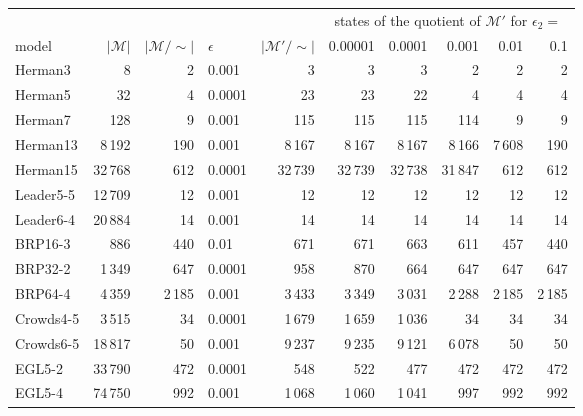 \documentclass[a4paper]{article}
\begin{document}
\begin{center}
\begin{tabular}{lrr@{\quad}lr@{\quad}rrrrr}
\toprule
 & & & & & \multicolumn{5}{c}{states of the quotient of $\mathcal{M}'$ for $\epsilon_2 = {}$} \\
model & $|\mathcal{M}|$ & $|\mathcal{M}/{\sim}|$ & $\epsilon$ & $|\mathcal{M}'/{\sim}|$ & 0.00001 & 0.0001 & 0.001 & 0.01 & 0.1 \\
\midrule
Herman3 & 8 & 2 & 0.001 & 3 & 3 & 3 & \cellcolor{recovered}2 & \cellcolor{recovered}2 & \cellcolor{recovered}2 \\
Herman5 & 32 & 4 & 0.0001 & 23 & 23 & 22 & \cellcolor{recovered}4 & \cellcolor{recovered}4 & \cellcolor{recovered}4 \\
Herman7 & 128 & 9 & 0.001 & 115 & 115 & 115 & 114 & \cellcolor{recovered}9 & \cellcolor{recovered}9 \\
Herman13 & 8\,192 & 190 & 0.001 & 8\,167 & 8\,167 & 8\,167 & 8\,166 & 7\,608 & \cellcolor{recovered}190 \\
Herman15 & 32\,768 & 612 & 0.0001 & 32\,739 & 32\,739 & 32\,738 & 31\,847 & \cellcolor{recovered}612 & \cellcolor{recovered}612 \\
Leader5-5 & 12\,709 & 12 & 0.001 & \cellcolor{recovered}12 & \cellcolor{recovered}12 & \cellcolor{recovered}12 & \cellcolor{recovered}12 & \cellcolor{recovered}12 & \cellcolor{recovered}12 \\
Leader6-4 & 20\,884 & 14 & 0.001 & \cellcolor{recovered}14 & \cellcolor{recovered}14 & \cellcolor{recovered}14 & \cellcolor{recovered}14 & \cellcolor{recovered}14 & \cellcolor{recovered}14 \\
BRP16-3 & 886 & 440 & 0.01 & 671 & 671 & 663 & 611 & 457 & \cellcolor{recovered}440 \\
BRP32-2 & 1\,349 & 647 & 0.0001 & 958 & 870 & 664 & \cellcolor{recovered}647 & \cellcolor{recovered}647 & \cellcolor{recovered}647 \\
BRP64-4 & 4\,359 & 2\,185 & 0.001 & 3\,433 & 3\,349 & 3\,031 & 2\,288 & \cellcolor{recovered}2\,185 & \cellcolor{recovered}2\,185 \\
Crowds4-5 & 3\,515 & 34 & 0.0001 & 1\,679 & 1\,659 & 1\,036 & \cellcolor{recovered}34 & \cellcolor{recovered}34 & \cellcolor{recovered}34 \\
Crowds6-5 & 18\,817 & 50 & 0.001 & 9\,237 & 9\,235 & 9\,121 & 6\,078 & \cellcolor{recovered}50 & \cellcolor{recovered}50 \\
EGL5-2 & 33\,790 & 472 & 0.0001 & 548 & 522 & 477 & \cellcolor{recovered}472 & \cellcolor{recovered}472 & \cellcolor{recovered}472 \\
EGL5-4 & 74\,750 & 992 & 0.001 & 1\,068 & 1\,060 & 1\,041 & 997 & \cellcolor{recovered}992 & \cellcolor{recovered}992 \\
\bottomrule
\end{tabular}
\end{center}
\end{document}
